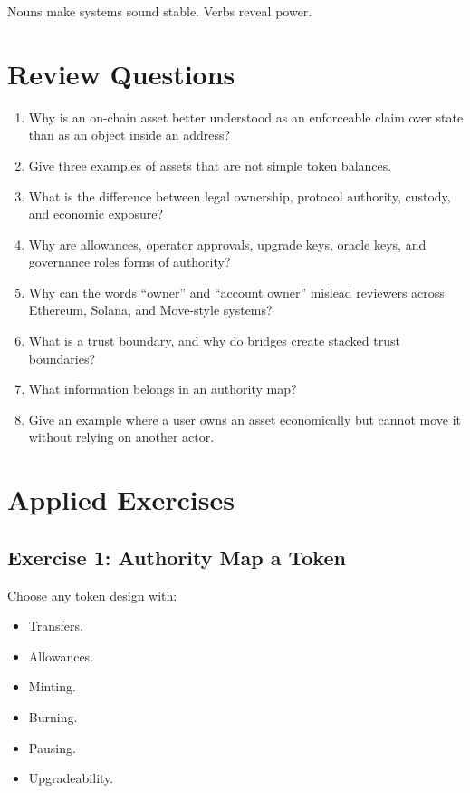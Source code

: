 Nouns make systems sound stable. Verbs reveal power.

\section{Review Questions}

\begin{enumerate}
\def\labelenumi{\arabic{enumi}.}
\tightlist
\item
  Why is an on-chain asset better understood as an enforceable claim
  over state than as an object inside an address?
\item
  Give three examples of assets that are not simple token balances.
\item
  What is the difference between legal ownership, protocol authority,
  custody, and economic exposure?
\item
  Why are allowances, operator approvals, upgrade keys, oracle keys, and
  governance roles forms of authority?
\item
  Why can the words ``owner'' and ``account owner'' mislead reviewers
  across Ethereum, Solana, and Move-style systems?
\item
  What is a trust boundary, and why do bridges create stacked trust
  boundaries?
\item
  What information belongs in an authority map?
\item
  Give an example where a user owns an asset economically but cannot
  move it without relying on another actor.
\end{enumerate}

\section{Applied Exercises}

\subsection{Exercise 1: Authority Map a Token}

Choose any token design with:

\begin{itemize}
\tightlist
\item
  Transfers.
\item
  Allowances.
\item
  Minting.
\item
  Burning.
\item
  Pausing.
\item
  Upgradeability.
\end{itemize}

